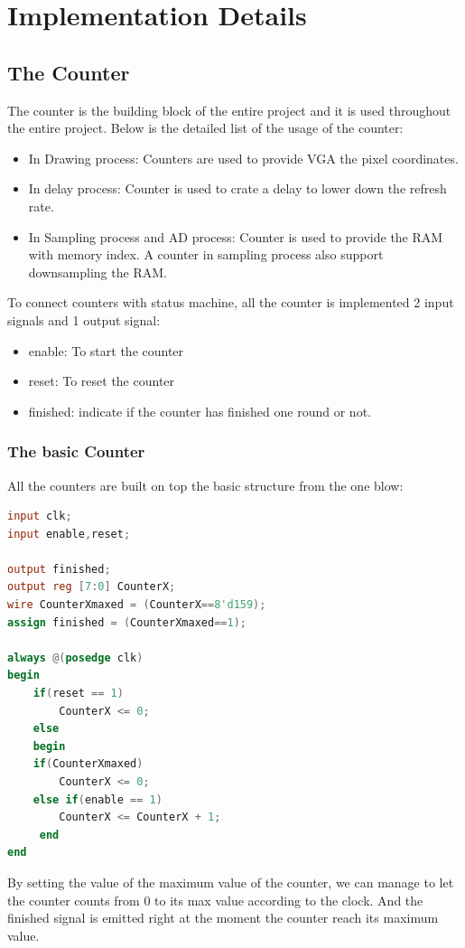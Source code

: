 \documentclass[11pt]{scrartcl}
\begin{document}
\section{Implementation Details}
\subsection{The Counter}
The counter is the building block of the entire project and it is used throughout the entire project. Below is the detailed list of the usage of the counter:
\begin{itemize}
    \item In Drawing process:
     Counters are used to provide VGA the pixel coordinates.
     \item In delay process:
     Counter is used to crate a delay to lower down the refresh rate.
     \item In Sampling process and AD process:
    Counter is used to provide the RAM with memory index. A counter in sampling process also support downsampling the RAM.
\end{itemize}

To connect counters with status machine, all the counter is implemented 2 input signals and 1 output signal:
\begin{itemize}
    \item enable: To start the counter
    \item reset: To reset the counter
    \item finished: indicate if the counter has finished one round or not.
\end{itemize}
\subsubsection{The basic Counter}
\label{sec:bascount}
All the counters are built on top the basic structure from the one blow:

\begin{lstlisting}[language=Verilog]
input clk;
input enable,reset;

output finished;
output reg [7:0] CounterX;
wire CounterXmaxed = (CounterX==8'd159); 
assign finished = (CounterXmaxed==1);

always @(posedge clk)
begin
	if(reset == 1)
		CounterX <= 0;
	else
	begin
	if(CounterXmaxed)
	  	CounterX <= 0;
	else if(enable == 1)
	  	CounterX <= CounterX + 1;
	 end
end
\end{lstlisting}

By setting the value of the maximum value of the counter, we can manage to let the counter counts from 0 to its max value according to the clock. And the finished signal is emitted right at the moment the counter reach its maximum value.
\end{document}
